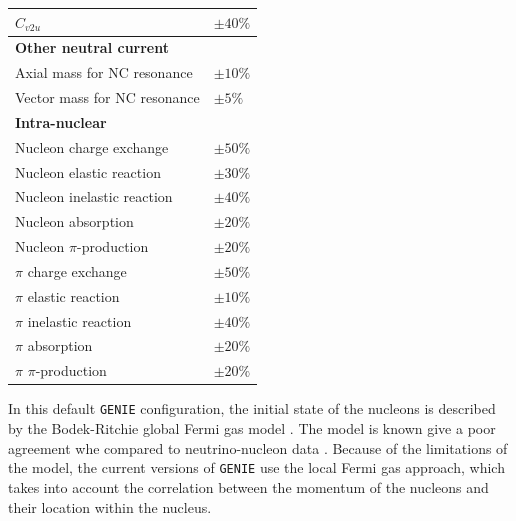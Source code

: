 \begin{table}[p!]
\begin{center}
\begin{small}
\begin{tabular}{l|l}
                $C_{v2u}$                                      & $\pm 40\%$                      \\[2mm] \hline
                \rule{0pt}{1.1\normalbaselineskip}\textbf{Other neutral current}                 &                                 \\[2mm]
                Axial mass for NC resonance                    & $\pm 10\%$                      \\[2mm]
                Vector mass for NC resonance                   & $\pm 5\%$                       \\[2mm] \hline
                \rule{0pt}{1.1\normalbaselineskip}\textbf{Intra-nuclear}                         &                                 \\[2mm]
                Nucleon charge exchange                        & $\pm 50\%$                      \\[2mm]
                Nucleon elastic reaction                       & $\pm 30\%$                      \\[2mm]
                Nucleon inelastic reaction                     & $\pm 40\%$                      \\[2mm]
                Nucleon absorption                             & $\pm 20\%$                      \\[2mm]
                Nucleon $\pi$-production                       & $\pm 20\%$                      \\[2mm]
                $\pi$ charge exchange                          & $\pm 50\%$                      \\[2mm]
                $\pi$ elastic reaction                         & $\pm 10\%$                      \\[2mm]
                $\pi$ inelastic reaction                       & $\pm 40\%$                      \\[2mm]
                $\pi$ absorption                               & $\pm 20\%$                      \\[2mm]
                $\pi$ $\pi$-production                         & $\pm 20\%$                     
            \end{tabular}
		\end{small}
	\end{center}
	\label{tab:xsec_genie_systs}
\end{table}

In this default \texttt{GENIE} configuration, the initial state of the nucleons is described by the Bodek-Ritchie global Fermi gas model \cite{Bodek1980}. The model is known give a poor agreement whe compared to neutrino-nucleon data \cite{Wilkinson2016}. Because of the limitations of the model, the current versions of \texttt{GENIE} use the local Fermi gas approach, which takes into account the correlation between the momentum of the nucleons and their location within the nucleus.

